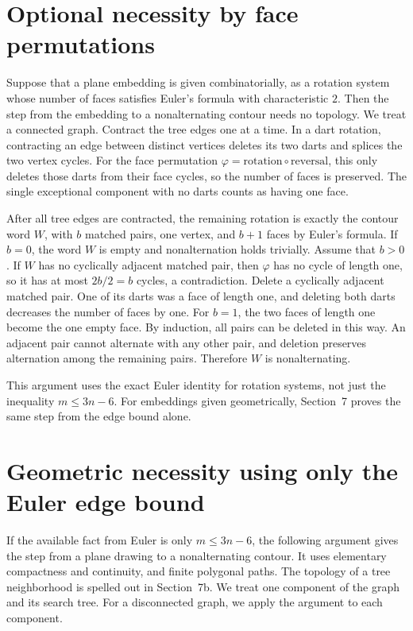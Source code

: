 \documentclass[11pt]{article}
\begin{document}
\section{Optional necessity by face permutations}

Suppose that a plane embedding is given combinatorially, as a rotation system
whose number of faces satisfies Euler's formula with characteristic $2$. Then
the step from the embedding to a nonalternating contour needs no topology. We
treat a connected graph. Contract the tree edges one at a time. In a dart
rotation, contracting an edge between distinct vertices deletes its two darts
and splices the two vertex cycles. For the face permutation
$\varphi=\text{rotation}\circ\text{reversal}$, this only deletes those darts
from their face cycles, so the number of faces is preserved. The single
exceptional component with no darts counts as having one face.

After all tree edges are contracted, the remaining rotation is exactly the
contour word $W$, with $b$ matched pairs, one vertex, and $b+1$ faces by
Euler's formula. If $b=0$, the word $W$ is empty and nonalternation holds
trivially. Assume that $b>0$. If $W$ has no cyclically adjacent matched pair,
then $\varphi$ has no cycle of length one, so it has at most $2b/2=b$ cycles,
a contradiction. Delete a cyclically adjacent matched pair. One of its darts
was a face of length one, and deleting both darts decreases the number of faces
by one. For $b=1$, the two faces of length one become the one empty face. By
induction, all pairs can be deleted in this way. An adjacent pair cannot
alternate with any other pair, and deletion preserves alternation among the
remaining pairs. Therefore $W$ is nonalternating.

This argument uses the exact Euler identity for rotation systems, not just the
inequality $m\le3n-6$. For embeddings given geometrically, Section~7 proves the
same step from the edge bound alone.

\section{Geometric necessity using only the Euler edge bound}

If the available fact from Euler is only $m\le3n-6$, the following argument
gives the step from a plane drawing to a nonalternating contour. It uses
elementary compactness and continuity, and finite polygonal paths. The
topology of a tree neighborhood is spelled out in Section~7b. We treat one
component of the graph and its search tree. For a disconnected graph, we apply
the argument to each component.
\end{document}
